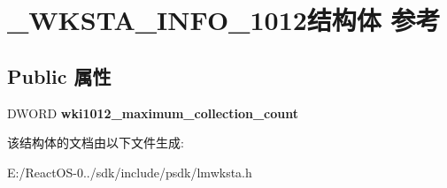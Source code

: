 \hypertarget{struct___w_k_s_t_a___i_n_f_o__1012}{}\section{\+\_\+\+W\+K\+S\+T\+A\+\_\+\+I\+N\+F\+O\+\_\+1012结构体 参考}
\label{struct___w_k_s_t_a___i_n_f_o__1012}
\subsection*{Public 属性}
\begin{DoxyCompactItemize}
\item 
\mbox{\label{struct___w_k_s_t_a___i_n_f_o__1012_ab5f5f46ca801c70c46e84eba28b33442}} 
D\+W\+O\+RD {\bfseries wki1012\+\_\+maximum\+\_\+collection\+\_\+count}
\end{DoxyCompactItemize}


该结构体的文档由以下文件生成\+:\begin{DoxyCompactItemize}
\item 
E\+:/\+React\+O\+S-\/0../sdk/include/psdk/lmwksta.\+h\end{DoxyCompactItemize}
